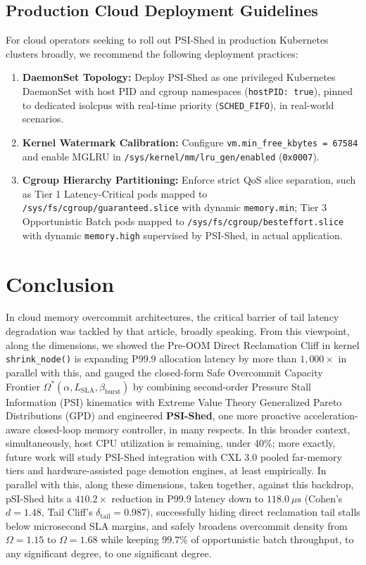 \documentclass[pdflatex,sn-mathphys,Numbered]{sn-jnl}
\begin{document}
\subsection{Production Cloud Deployment Guidelines}
For cloud operators seeking to roll out PSI-Shed in production Kubernetes clusters broadly, we recommend the following deployment practices:
\begin{enumerate}
    \item \textbf{DaemonSet Topology:} Deploy PSI-Shed as one privileged Kubernetes DaemonSet with host PID and cgroup namespaces (\texttt{hostPID: true}), pinned to dedicated isolcpus with real-time priority (\texttt{SCHED\_FIFO}), in real-world scenarios.
    \item \textbf{Kernel Watermark Calibration:} Configure \texttt{vm.min\_free\_kbytes = 67584} and enable MGLRU in \texttt{/sys/kernel/mm/lru\_gen/enabled} (\texttt{0x0007}).
    \item \textbf{Cgroup Hierarchy Partitioning:} Enforce strict QoS slice separation, such as Tier 1 Latency-Critical pods mapped to \texttt{/sys/fs/cgroup/guaranteed.slice} with dynamic \texttt{memory.min}; Tier 3 Opportunistic Batch pods mapped to \texttt{/sys/fs/cgroup/besteffort.slice} with dynamic \texttt{memory.high} supervised by PSI-Shed, in actual application.
\end{enumerate}

\section{Conclusion}
\label{sec:conclusion}
In cloud memory overcommit architectures, the critical barrier of tail latency degradation was tackled by that article, broadly speaking. From this viewpoint, along the dimensions, we showed the Pre-OOM Direct Reclamation Cliff in kernel \texttt{shrink\_node()} is expanding P99.9 allocation latency by more than $1,000\times$ in parallel with this, and gauged the closed-form Safe Overcommit Capacity Frontier $\Omega^*(\alpha, L_{\text{SLA}}, \beta_{\text{burst}})$ by combining second-order Pressure Stall Information (PSI) kinematics with Extreme Value Theory Generalized Pareto Distributions (GPD) and engineered \textbf{PSI-Shed}, one more proactive acceleration-aware closed-loop memory controller, in many respects. In this broader context, simultaneously, host CPU utilization is remaining, under 40\%; more exactly, future work will study PSI-Shed integration with CXL 3.0 pooled far-memory tiers and hardware-assisted page demotion engines, at least empirically. In parallel with this, along these dimensions, taken together, against this backdrop, pSI-Shed hits a $410.2\times$ reduction in P99.9 latency down to $118.0\ \mu\text{s}$ (Cohen's $d = 1.48$, Tail Cliff's $\delta_{\text{tail}} = 0.987$), successfully hiding direct reclamation tail stalls below microsecond SLA margins, and safely broadens overcommit density from $\Omega = 1.15$ to $\Omega = 1.68$ while keeping $99.7\%$ of opportunistic batch throughput, to any significant degree, to one significant degree.
\end{document}
